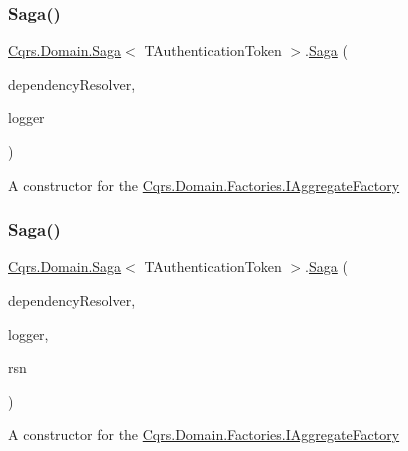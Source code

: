 \subsubsection{\texorpdfstring{Saga()}{Saga()}\hspace{0.1cm}{\footnotesize\ttfamily [2/3]}}
{\footnotesize\ttfamily \hyperlink{classCqrs_1_1Domain_1_1Saga}{Cqrs.\+Domain.\+Saga}$<$ T\+Authentication\+Token $>$.\hyperlink{classCqrs_1_1Domain_1_1Saga}{Saga} (\begin{DoxyParamCaption}\item[{\hyperlink{interfaceCqrs_1_1Configuration_1_1IDependencyResolver}{I\+Dependency\+Resolver}}]{dependency\+Resolver,  }\item[{I\+Logger}]{logger }\end{DoxyParamCaption})\hspace{0.3cm}{\ttfamily [protected]}}



A constructor for the \hyperlink{interfaceCqrs_1_1Domain_1_1Factories_1_1IAggregateFactory}{Cqrs.\+Domain.\+Factories.\+I\+Aggregate\+Factory} 

\mbox{\label{classCqrs_1_1Domain_1_1Saga_acba7142c5e3ad568a60dc365fb7e8733_acba7142c5e3ad568a60dc365fb7e8733}} 
\subsubsection{\texorpdfstring{Saga()}{Saga()}\hspace{0.1cm}{\footnotesize\ttfamily [3/3]}}
{\footnotesize\ttfamily \hyperlink{classCqrs_1_1Domain_1_1Saga}{Cqrs.\+Domain.\+Saga}$<$ T\+Authentication\+Token $>$.\hyperlink{classCqrs_1_1Domain_1_1Saga}{Saga} (\begin{DoxyParamCaption}\item[{\hyperlink{interfaceCqrs_1_1Configuration_1_1IDependencyResolver}{I\+Dependency\+Resolver}}]{dependency\+Resolver,  }\item[{I\+Logger}]{logger,  }\item[{Guid}]{rsn }\end{DoxyParamCaption})\hspace{0.3cm}{\ttfamily [protected]}}



A constructor for the \hyperlink{interfaceCqrs_1_1Domain_1_1Factories_1_1IAggregateFactory}{Cqrs.\+Domain.\+Factories.\+I\+Aggregate\+Factory} 



